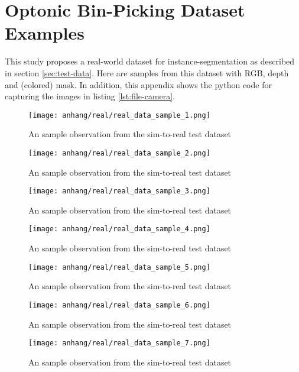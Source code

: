 \chapter{Optonic Bin-Picking Dataset Examples}
\label{appendix:testdata-examples-simtoreal}

	This study proposes a real-world dataset for instance-segmentation as described in section \ref{sec:test-data}. Here are samples from this dataset with RGB, depth and (colored) mask. In addition, this appendix shows the python code for capturing the images in listing \ref{lst:file-camera}.
	
	\begin{figure}[H]
		\centering
		\texttt{[image: anhang/real/real\_data\_sample\_1.png]}
		\caption[An sample observation from the sim-to-real test dataset.]{An sample observation from the sim-to-real test dataset}
	\end{figure}
	\begin{figure}[H]
		\centering
		\texttt{[image: anhang/real/real\_data\_sample\_2.png]}
		\caption[An sample observation from the sim-to-real test dataset.]{An sample observation from the sim-to-real test dataset}
	\end{figure}
	\begin{figure}[H]
		\centering
		\texttt{[image: anhang/real/real\_data\_sample\_3.png]}
		\caption[An sample observation from the sim-to-real test dataset.]{An sample observation from the sim-to-real test dataset}
	\end{figure}
	\begin{figure}[H]
		\centering
		\texttt{[image: anhang/real/real\_data\_sample\_4.png]}
		\caption[An sample observation from the sim-to-real test dataset.]{An sample observation from the sim-to-real test dataset}
	\end{figure}
	\begin{figure}[H]
		\centering
		\texttt{[image: anhang/real/real\_data\_sample\_5.png]}
		\caption[An sample observation from the sim-to-real test dataset.]{An sample observation from the sim-to-real test dataset}
	\end{figure}
	\begin{figure}[H]
		\centering
		\texttt{[image: anhang/real/real\_data\_sample\_6.png]}
		\caption[An sample observation from the sim-to-real test dataset.]{An sample observation from the sim-to-real test dataset}
	\end{figure}
	\begin{figure}[H]
		\centering
		\texttt{[image: anhang/real/real\_data\_sample\_7.png]}
		\caption[An sample observation from the sim-to-real test dataset.]{An sample observation from the sim-to-real test dataset}
	\end{figure}
